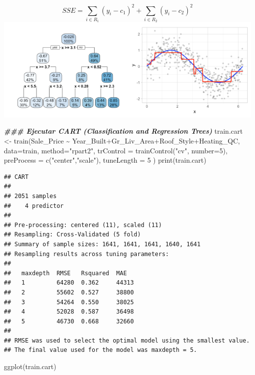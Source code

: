 \documentclass[
]{article}
\newenvironment{Shaded}{\begin{snugshade}}{\end{snugshade}}
\newcommand{\AttributeTok}[1]{\textcolor[rgb]{0.77,0.63,0.00}{#1}}
\newcommand{\DecValTok}[1]{\textcolor[rgb]{0.00,0.00,0.81}{#1}}
\newcommand{\DocumentationTok}[1]{\textcolor[rgb]{0.56,0.35,0.01}{\textbf{\textit{#1}}}}
\newcommand{\FunctionTok}[1]{\textcolor[rgb]{0.00,0.00,0.00}{#1}}
\newcommand{\NormalTok}[1]{#1}
\newcommand{\OtherTok}[1]{\textcolor[rgb]{0.56,0.35,0.01}{#1}}
\newcommand{\SpecialCharTok}[1]{\textcolor[rgb]{0.00,0.00,0.00}{#1}}
\newcommand{\StringTok}[1]{\textcolor[rgb]{0.31,0.60,0.02}{#1}}
\begin{document}
\[SSE=\sum_{i\in R_1} (y_i-c_1)^2 + \sum_{i\in R_2} (y_i-c_2)^2 \]
\includegraphics{5.png}

\begin{Shaded}
\begin{Highlighting}[]
\DocumentationTok{\#\#\# Ejecutar CART (Classification and Regression Trees)}
\NormalTok{train.cart }\OtherTok{\textless{}{-}} \FunctionTok{train}\NormalTok{(Sale\_Price }\SpecialCharTok{\textasciitilde{}}\NormalTok{ Year\_Built}\SpecialCharTok{+}\NormalTok{Gr\_Liv\_Area}\SpecialCharTok{+}\NormalTok{Roof\_Style}\SpecialCharTok{+}\NormalTok{Heating\_QC, }
                    \AttributeTok{data=}\NormalTok{train, }\AttributeTok{method=}\StringTok{"rpart2"}\NormalTok{,  }
                    \AttributeTok{trControl =} \FunctionTok{trainControl}\NormalTok{(}\StringTok{"cv"}\NormalTok{, }\AttributeTok{number=}\DecValTok{5}\NormalTok{),}
                    \AttributeTok{preProcess =} \FunctionTok{c}\NormalTok{(}\StringTok{"center"}\NormalTok{,}\StringTok{"scale"}\NormalTok{),}
                    \AttributeTok{tuneLength =} \DecValTok{5}
\NormalTok{)}
\FunctionTok{print}\NormalTok{(train.cart)}
\end{Highlighting}
\end{Shaded}

\begin{verbatim}
## CART 
## 
## 2051 samples
##    4 predictor
## 
## Pre-processing: centered (11), scaled (11) 
## Resampling: Cross-Validated (5 fold) 
## Summary of sample sizes: 1641, 1641, 1641, 1640, 1641 
## Resampling results across tuning parameters:
## 
##   maxdepth  RMSE   Rsquared  MAE  
##   1         64280  0.362     44313
##   2         55602  0.527     38800
##   3         54264  0.550     38025
##   4         52028  0.587     36498
##   5         46730  0.668     32660
## 
## RMSE was used to select the optimal model using the smallest value.
## The final value used for the model was maxdepth = 5.
\end{verbatim}

\begin{Shaded}
\begin{Highlighting}[]
\FunctionTok{ggplot}\NormalTok{(train.cart)}
\end{Highlighting}
\end{Shaded}
\end{document}
